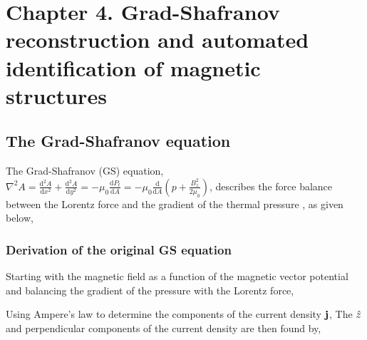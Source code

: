\chapter{Chapter 4. Grad-Shafranov reconstruction and automated identification of magnetic structures} \label{ch:ch4}

\section{The Grad-Shafranov equation}
%
The Grad-Shafranov (GS) equation, $\nabla^2 A = \frac{\mathrm{d}^2 A}{\mathrm{d}x^2} + \frac{\mathrm{d}^2 A}{\mathrm{d}y^2} = -\mu_0 \frac{\mathrm{d}P_t}{\mathrm{d}A} = - \mu_0\frac{\mathrm{d}}{\mathrm{d}A}\left(p + \frac{B_z^2}{2\mu_0}\right)$, describes the force balance between the Lorentz force and the gradient of the thermal pressure \cite{Sonnerup:1996, Hau:1999}, as given below,

\subsection{Derivation of the original GS equation}
Starting with the magnetic field as a function of the magnetic vector potential and balancing the gradient of the pressure with the Lorentz force,

\noindent Using Ampere's law to determine the components of the current density $\mathbf{j}$,
The $\hat{z}$ and perpendicular components of the current density are then found by,

